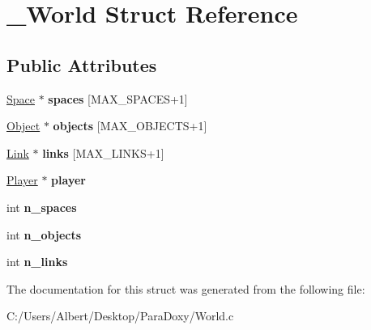 \hypertarget{struct___world}{\section{\-\_\-\-World Struct Reference}
\label{struct___world}
}
\subsection*{Public Attributes}
\begin{DoxyCompactItemize}
\item 
\hypertarget{struct___world_a9ed563604df72c6f353b3383d3a5bf0d}{\hyperlink{struct___space}{Space} $\ast$ {\bfseries spaces} \mbox{[}M\-A\-X\-\_\-\-S\-P\-A\-C\-E\-S+1\mbox{]}}\label{struct___world_a9ed563604df72c6f353b3383d3a5bf0d}

\item 
\hypertarget{struct___world_a68f41cc364f137e1aa98384c1a9351b2}{\hyperlink{struct___object}{Object} $\ast$ {\bfseries objects} \mbox{[}M\-A\-X\-\_\-\-O\-B\-J\-E\-C\-T\-S+1\mbox{]}}\label{struct___world_a68f41cc364f137e1aa98384c1a9351b2}

\item 
\hypertarget{struct___world_aefb1cc163e7bfc82751dd2d5764d5a23}{\hyperlink{struct___link}{Link} $\ast$ {\bfseries links} \mbox{[}M\-A\-X\-\_\-\-L\-I\-N\-K\-S+1\mbox{]}}\label{struct___world_aefb1cc163e7bfc82751dd2d5764d5a23}

\item 
\hypertarget{struct___world_addb4bfc17a52aa60dcb044f029c54120}{\hyperlink{struct___player}{Player} $\ast$ {\bfseries player}}\label{struct___world_addb4bfc17a52aa60dcb044f029c54120}

\item 
\hypertarget{struct___world_af1096c2f3ebc5de569d6de790a20fcb5}{int {\bfseries n\-\_\-spaces}}\label{struct___world_af1096c2f3ebc5de569d6de790a20fcb5}

\item 
\hypertarget{struct___world_a52fb5bd7179f03f630dae14353f229bb}{int {\bfseries n\-\_\-objects}}\label{struct___world_a52fb5bd7179f03f630dae14353f229bb}

\item 
\hypertarget{struct___world_a3fa7359ad098e55d12d8d79827986e68}{int {\bfseries n\-\_\-links}}\label{struct___world_a3fa7359ad098e55d12d8d79827986e68}

\end{DoxyCompactItemize}


The documentation for this struct was generated from the following file\-:\begin{DoxyCompactItemize}
\item 
C\-:/\-Users/\-Albert/\-Desktop/\-Para\-Doxy/World.\-c\end{DoxyCompactItemize}
